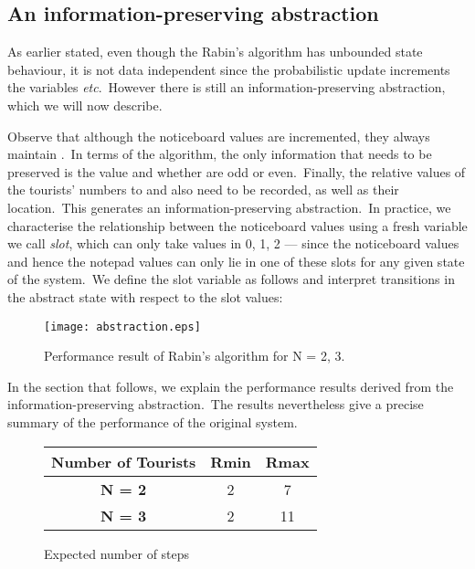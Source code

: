 \documentclass[numbers,copyright,creativecommons]{eptcs}
\begin{document}
\subsection{An information-preserving abstraction}
As earlier stated, even though the Rabin's algorithm has unbounded state behaviour, it is not data independent since the probabilistic update increments the variables  {\it etc}.\ However there is still an information-preserving abstraction, which we will now describe.

Observe that although the noticeboard values are incremented, they always maintain .\ In terms of the algorithm, the only information that needs to be preserved is the value  and whether  are odd or even.\ Finally, the relative values of the tourists' numbers to  and  also need to be recorded, as well as their location.\ This generates an information-preserving abstraction.\ In practice, we characterise the relationship between the noticeboard values using a fresh variable we call {\it slot}, which can only take values in 0, 1, 2 --- since the noticeboard values and hence the notepad values can only lie in one of these slots for any given state of the system.\ We define the slot variable as follows and interpret transitions in the abstract state with respect to the slot values:



\begin{figure}
\begin{center}
\texttt{[image: abstraction.eps]}
\end{center}\vspace{-0.5cm}

\caption{Performance result of Rabin's algorithm for N = 2, 3.}\label{fig:abstraction}
\end{figure}
In the section that follows, we explain the performance results derived from the information-preserving abstraction.\ The results nevertheless give a precise summary of the performance of the original system.

\begin{figure}
\begin{center}
\noindent\begin{tabular}{|c|c|c|}
\hline
{\quad \bf Number of Tourists\quad } & {\quad \bf Rmin \quad } & {\quad \bf Rmax \quad}\\ \hline
{\bf N = 2} &  2 & 7 \\
\hline
{\bf N = 3} &  2 & 11 \\
\hline
\end{tabular}
\caption{\rm Expected number of steps} \label{fig:analysis}\vspace{-.5cm}
\end{center}
\end{figure}
\end{document}
